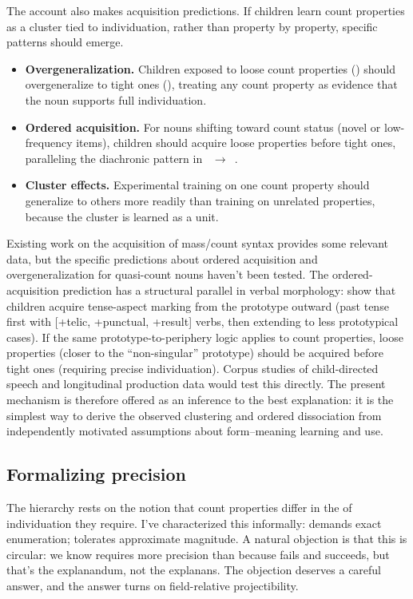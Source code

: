 \documentclass[12pt,a4paper]{article}
\begin{document}
The account also makes acquisition predictions. If children learn count properties as a cluster tied to individuation, rather than property by property, specific patterns should emerge.

\begin{itemize}
\item \textbf{Overgeneralization.} Children exposed to loose count properties () should overgeneralize to tight ones (), treating any count property as evidence that the noun supports full individuation.
\item \textbf{Ordered acquisition.} For nouns shifting toward count status (novel or low-frequency items), children should acquire loose properties before tight ones, paralleling the diachronic pattern in ~$\to$~.
\item \textbf{Cluster effects.} Experimental training on one count property should generalize to others more readily than training on unrelated properties, because the cluster is learned as a unit.
\end{itemize}

Existing work on the acquisition of mass/count syntax \citep{barner2005} provides some relevant data, but the specific predictions about ordered acquisition and overgeneralization for quasi-count nouns haven't been tested. The ordered-acquisition prediction has a structural parallel in verbal morphology: \textcite{shirai1995} show that children acquire tense-aspect marking from the prototype outward (past tense first with [+telic, +punctual, +result] verbs, then extending to less prototypical cases). If the same prototype-to-periphery logic applies to count properties, loose properties (closer to the ``non-singular'' prototype) should be acquired before tight ones (requiring precise individuation). Corpus studies of child-directed speech and longitudinal production data would test this directly. The present mechanism is therefore offered as an inference to the best explanation: it is the simplest way to derive the observed clustering and ordered dissociation from independently motivated assumptions about form--meaning learning and use.

\subsection{Formalizing precision}

The hierarchy rests on the notion that count properties differ in the  of individuation they require. I've characterized this informally:  demands exact enumeration;  tolerates approximate magnitude. A natural objection is that this is circular: we know  requires more precision than  because  fails and  succeeds, but that's the explanandum, not the explanans. The objection deserves a careful answer, and the answer turns on field-relative projectibility.
\end{document}
